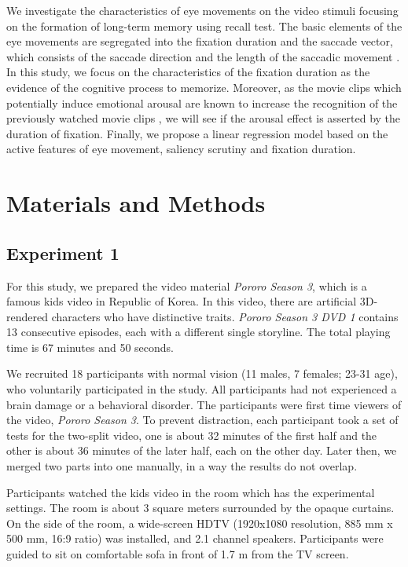 \documentclass[oneside,master]{snueethesis}
\begin{document}
We investigate the characteristics of eye movements on the video stimuli focusing on the formation of long-term memory using recall test. The basic elements of the eye movements are segregated into the fixation duration and the saccade vector, which consists of the saccade direction and the length of the saccadic movement \cite{Findlay1999,Feng2006}. In this study, we focus on the characteristics of the fixation duration as the evidence of the cognitive process to memorize. Moreover, as the movie clips which potentially induce emotional arousal are known to increase the recognition of the previously watched movie clips \cite{Cahill1996amyg,Cahill1998baso}, we will see if the arousal effect is asserted by the duration of fixation. Finally, we propose a linear regression model based on the active features of eye movement, saliency scrutiny and fixation duration.



\chapter{Materials and Methods}
\label{sec:material-and-methods}


\section{Experiment 1}

For this study, we prepared the video material \textit{Pororo Season 3}, which is a famous kids video in Republic of Korea. In this video, there are artificial 3D-rendered characters who have distinctive traits. \textit{Pororo Season 3 DVD 1} contains 13 consecutive episodes, each with a different single storyline. The total playing time is 67 minutes and 50 seconds.

We recruited 18 participants with normal vision (11 males, 7 females; 23-31 age), who voluntarily participated in the study. All participants had not experienced a brain damage or a behavioral disorder. The participants were first time viewers of the video, \textit{Pororo Season 3}. To prevent distraction, each participant took a set of tests for the two-split video, one is about 32 minutes of the first half and the other is about 36 minutes of the later half, each on the other day. Later then, we merged two parts into one manually, in a way the results do not overlap.

Participants watched the kids video in the room which has the experimental settings. The room is about 3 square meters surrounded by the opaque curtains. On the side of the room, a wide-screen HDTV (1920x1080 resolution, 885 mm x 500 mm, 16:9 ratio) was installed, and 2.1 channel speakers. Participants were guided to sit on comfortable sofa in front of 1.7 m from the TV screen.
\end{document}
